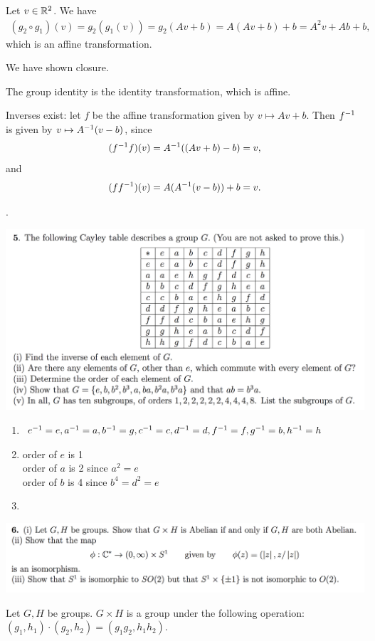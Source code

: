 \documentclass[12pt]{article}
\begin{document}
Let $v \in \mathbb{R}^2$. We have
\begin{align*}
  (g_2 \circ g_1)(v)
  = g_2(g_1(v))
  = g_2(Av + b)
  = A(Av + b) + b
  = A^2v + Ab + b,
\end{align*}
which is an affine transformation.

We have shown closure.

The group identity is the identity transformation, which is affine.

Inverses exist: let $f$ be the affine transformation given by $v \mapsto Av + b$. Then $f^{-1}$ is
given by $v \mapsto A^{-1}(v - b)$, since
\begin{align*}
(f^{-1}f)(v) = A^{-1}((Av + b) - b) = v,
\end{align*}
and
\begin{align*}
(ff^{-1})(v) = A(A^{-1}(v - b)) + b = v.
\end{align*}

.

\newpage
\begin{mdframed}
\includegraphics[width=400pt]{img/oxford-prelims-M1-groups-1-5.png}
\end{mdframed}
\begin{enumerate}[label=(\roman*)]
\item $e^{-1} = e, a^{-1} = a, b^{-1} = g, c^{-1} = c, d^{-1} = d, f^{-1} = f, g^{-1} = b, h^{-1} = h$
\item
  order of $e$ is 1\\
  order of $a$ is 2 since $a^2 = e$\\
  order of $b$ is 4 since $b^4 = d^2 = e$
\item
\end{enumerate}
\newpage
\begin{mdframed}
\includegraphics[width=400pt]{img/oxford-prelims-M1-groups-1-6.png}
\end{mdframed}
\begin{definition*}
  Let $G, H$ be groups. $G \times H$ is a group under the following operation:
  $(g_1, h_1) \cdot (g_2, h_2) = (g_1g_2, h_1h_2)$.
\end{definition*}
\end{document}
